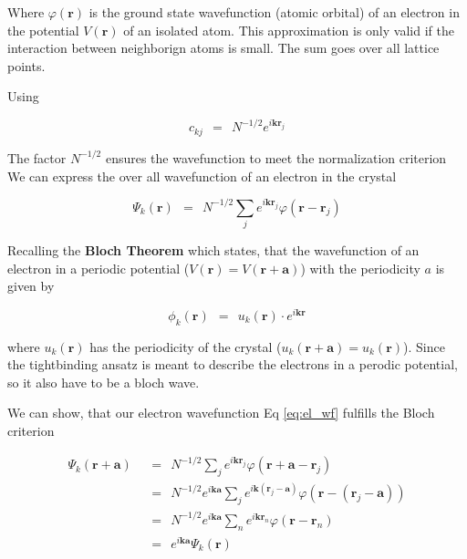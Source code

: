 \documentclass[10pt]{report}
\numberwithin{equation}{chapter}
\newcommand{\refEq}[1]{
  Eq  \ref{#1}
}
\begin{document}
Where $\varphi(\mathbf{r})$ is the ground state wavefunction (atomic orbital) of an electron in the potential $V(\mathbf{r})$ of an isolated atom. This approximation is only valid if the interaction between neighborign atoms is small. The sum goes over all lattice points.


Using

\begin{equation}
  c_{kj} ~~=~~ N^{-1/2} e^{i \mathbf{k} \mathbf{r}_j}
\end{equation}

The factor $N^{-1/2}$ ensures the wavefunction to meet the normalization criterion
We can express the over all wavefunction of an electron in the crystal

\begin{equation} \label{eq:el_wf}
  \Psi_k(\mathbf{r}) 
  ~~=~~ N^{-1/2} \sum_j e^{i\mathbf{k} \mathbf{r}_j} \varphi(\mathbf{r} - \mathbf{r}_j)
\end{equation}


Recalling the \textbf{Bloch Theorem} which states, that the wavefunction of an electron in a periodic potential ($V(\mathbf{r}) = V(\mathbf{r} + \mathbf{a})$) with the periodicity $a$ is given by

\begin{equation} \label{eq:bloch_theorem}
  \phi_k(\mathbf{r}) ~~=~~ u_k(\mathbf{r}) \cdot e^{i\mathbf{k} \mathbf{r}}
\end{equation}

where $u_k(\mathbf{r})$ has the periodicity of the crystal ($u_k(\mathbf{r} + \mathbf{a}) = u_k(\mathbf{r})$). Since the tightbinding ansatz is meant to describe the electrons in a perodic potential, so it also have to be a bloch wave. 


We can show, that our electron wavefunction \refEq{eq:el_wf} fulfills the Bloch criterion


\begin{align}
  \Psi_k(\mathbf{r} + \mathbf{a}) 
  ~~& =~~ N^{-1/2} \sum_j e^{i \mathbf{k} \mathbf{r}_j} \varphi(\mathbf{r} + \mathbf{a} - \mathbf{r}_j) \nonumber \\
  ~~& =~~ N^{-1/2} e^{i\mathbf{k} \mathbf{a}} 
  \sum_j e^{i\mathbf{k} (\mathbf{r}_j - \mathbf{a})} \varphi(\mathbf{r} - (\mathbf{r}_j-\mathbf{a})) \nonumber \\
  ~~& =~~ N^{-1/2} e^{i\mathbf{k} \mathbf{a}}
  \sum_n e^{i\mathbf{k} \mathbf{r}_n} \varphi(\mathbf{r} - \mathbf{r}_n) \nonumber \\
  ~~& =~~ e^{i\mathbf{k} \mathbf{a}} \Psi_k(\mathbf{r})
\end{align}
\end{document}
